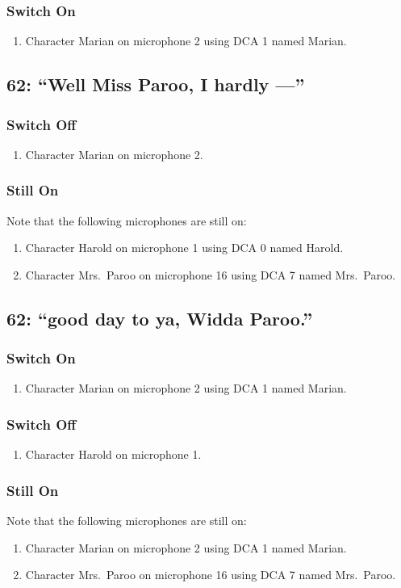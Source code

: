 \subsubsection* {Switch On}
\begin{enumerate}
\item Character Marian on microphone 2 using DCA 1 named Marian.
\end{enumerate}
\subsection* {62: ``Well Miss Paroo, I hardly ---''}
\subsubsection* {Switch Off}
\begin{enumerate}
\item Character Marian on microphone 2.
\end{enumerate}
\subsubsection* {Still On}
Note that the following microphones are still on:
\begin{enumerate}
\item Character Harold on microphone 1 using DCA 0 named Harold.
\item Character Mrs.~Paroo on microphone 16 using DCA 7 named Mrs.~Paroo.
\end{enumerate}
\subsection* {62: ``good day to ya, Widda Paroo.''}
\subsubsection* {Switch On}
\begin{enumerate}
\item Character Marian on microphone 2 using DCA 1 named Marian.
\end{enumerate}
\subsubsection* {Switch Off}
\begin{enumerate}
\item Character Harold on microphone 1.
\end{enumerate}
\subsubsection* {Still On}
Note that the following microphones are still on:
\begin{enumerate}
\item Character Marian on microphone 2 using DCA 1 named Marian.
\item Character Mrs.~Paroo on microphone 16 using DCA 7 named Mrs.~Paroo.
\end{enumerate}
